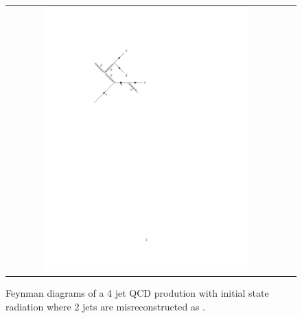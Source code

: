 \begin{figure}[tbh!]
	\centering
	\begin{tabular}{cc}
		\includegraphics[width=0.75\textwidth]{diagrams/pics/background_QCDinitrad.pdf}
	\end{tabular}
	\caption{Feynman diagrams of a 4 jet QCD prodution with initial state radiation where 2 jets are misreconstructed as \hadtau. }
	\label{fig:background_QCDinitrad}
\end{figure}

